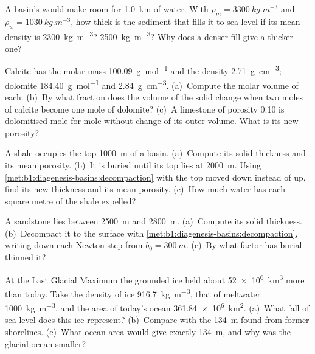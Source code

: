 \begin{exercise}[$\star$]\label{exo:b1:diagenesis-basins:3}
A basin's  would make room for \qty{1.0}{km} of water. With
$\rho_m = \qty{3300}{kg.m^{-3}}$ and $\rho_w = \qty{1030}{kg.m^{-3}}$, how
thick is the sediment that fills it to sea level if its mean density is
\qty{2300}{kg.m^{-3}}? \qty{2500}{kg.m^{-3}}? Why does a denser fill give a
thicker one?
\end{exercise}

\begin{exercise}[$\star$]\label{exo:b1:diagenesis-basins:4}
Calcite has the molar mass \qty{100.09}{g.mol^{-1}} and the density
\qty{2.71}{g.cm^{-3}}; dolomite \qty{184.40}{g.mol^{-1}} and
\qty{2.84}{g.cm^{-3}}. (a)~Compute the molar volume of each. (b)~By what
fraction does the volume of the solid change when two moles of calcite become
one mole of dolomite? (c)~A limestone of porosity \num{0.10} is dolomitised
mole for mole without change of its outer volume. What is its new porosity?
\end{exercise}

\begin{exercise}[$\star\star$]\label{exo:b1:diagenesis-basins:5}
A shale occupies the top \qty{1000}{m} of a basin. (a)~Compute its solid
thickness and its mean porosity. (b)~It is buried until its top lies at
\qty{2000}{m}. Using \cref{met:b1:diagenesis-basins:decompaction} with the top
moved down instead of up, find its new thickness and its mean porosity.
(c)~How much water has each square metre of the shale expelled?
\end{exercise}

\begin{exercise}[$\star\star$]\label{exo:b1:diagenesis-basins:6}
A sandstone lies between \qty{2500}{m} and \qty{2800}{m}. (a)~Compute its solid
thickness. (b)~Decompact it to the surface with
\cref{met:b1:diagenesis-basins:decompaction}, writing down each Newton step
from $b_0 = \qty{300}{m}$. (c)~By what factor has burial thinned it?
\end{exercise}

\begin{exercise}[$\star\star$]\label{exo:b1:diagenesis-basins:7}
At the Last Glacial Maximum the grounded ice held about \qty{52e6}{km^3} more
than today. Take the density of ice \qty{916.7}{kg.m^{-3}}, that of meltwater
\qty{1000}{kg.m^{-3}}, and the area of today's ocean
\qty{361.84e6}{km^2}. (a)~What fall of sea level does this ice represent?
(b)~Compare with the \qty{134}{m} found from former shorelines. (c)~What ocean
area would give exactly \qty{134}{m}, and why was the glacial ocean smaller?
\end{exercise}

